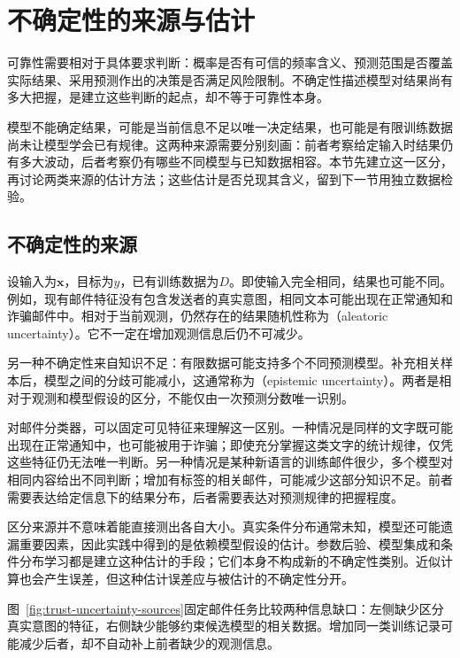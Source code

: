 \section{不确定性的来源与估计}
\label{sec:reliability-uncertainty}

可靠性需要相对于具体要求判断：概率是否有可信的频率含义、预测范围是否覆盖实际结果、采用预测作出的决策是否满足风险限制。不确定性描述模型对结果尚有多大把握，是建立这些判断的起点，却不等于可靠性本身。

模型不能确定结果，可能是当前信息不足以唯一决定结果，也可能是有限训练数据尚未让模型学会已有规律。这两种来源需要分别刻画：前者考察给定输入时结果仍有多大波动，后者考察仍有哪些不同模型与已知数据相容。本节先建立这一区分，再讨论两类来源的估计方法；这些估计是否兑现其含义，留到下一节用独立数据检验。

\subsection{不确定性的来源}
\label{sec:reliability-uncertainty-sources}

设输入为$\bm{x}$，目标为$y$，已有训练数据为$D$。即使输入完全相同，结果也可能不同。例如，现有邮件特征没有包含发送者的真实意图，相同文本可能出现在正常通知和诈骗邮件中。相对于当前观测，仍然存在的结果随机性称为（aleatoric uncertainty）。它不一定在增加观测信息后仍不可减少。

另一种不确定性来自知识不足：有限数据可能支持多个不同预测模型。补充相关样本后，模型之间的分歧可能减小，这通常称为（epistemic uncertainty）。两者是相对于观测和模型假设的区分，不能仅由一次预测分数唯一识别。

对邮件分类器，可以固定可见特征来理解这一区别。一种情况是同样的文字既可能出现在正常通知中，也可能被用于诈骗；即使充分掌握这类文字的统计规律，仅凭这些特征仍无法唯一判断。另一种情况是某种新语言的训练邮件很少，多个模型对相同内容给出不同判断；增加有标签的相关邮件，可能减少这部分知识不足。前者需要表达给定信息下的结果分布，后者需要表达对预测规律的把握程度。

区分来源并不意味着能直接测出各自大小。真实条件分布通常未知，模型还可能遗漏重要因素，因此实践中得到的是依赖模型假设的估计。参数后验、模型集成和条件分布学习都是建立这种估计的手段；它们本身不构成新的不确定性类别。近似计算也会产生误差，但这种估计误差应与被估计的不确定性分开。

图~\ref{fig:trust-uncertainty-sources}固定邮件任务比较两种信息缺口：左侧缺少区分真实意图的特征，右侧缺少能够约束候选模型的相关数据。增加同一类训练记录可能减少后者，却不自动补上前者缺少的观测信息。

